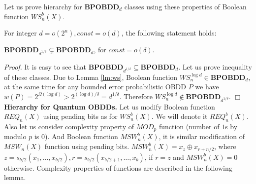 \documentclass{llncs}
\newcommand{\Beginproof}{{\em Proof.}  }
\newcommand{\Endproof}{\hfill$\Box$\\}
\begin{document}
Let us prove hierarchy for {\bf BPOBDD}$_d$ classes using these properties of Boolean function $WS_n^b(X)$.

\begin{theorem}\label{th:prob-hi}
For integer $d=o(2^n), const = o(d)$, the following statement holds: 

{\bf BPOBDD}$_{d^{1/\delta}}\subsetneq${\bf BPOBDD}$_d$, for  $const=o(\delta)$. 
\end{theorem}
\Beginproof
%
It is easy to see that {\bf BPOBDD}$_{d^{1/\delta}}\subseteq${\bf BPOBDD}$_d$. Let us prove inequality of these classes.
%
Due to Lemma \ref{lm:ws}, Boolean function $WS_n^{\log d}\in${\bf BPOBDD}$_d$, at the same time for any bounded error probabilistic OBDD $P$ we have $w(P)=2^{\Omega(\log d)}>2^{(\log d)/\delta}=d^{1/\delta}$. Therefore $WS_n^{\log d}\not\in${\bf BPOBDD}$_{d^{1/\delta}}$.
\Endproof

{\bf Hierarchy for Quantum OBDDs. }
Let us  modify Boolean function $REQ_n(X)$ using pending bits as for $WS_n^b(X)$. We will denote it $REQ^b_n(X)$. Also let us consider complexity property of $MOD_p$ function (number of $1$s by modulo $p$ is $0$). And Boolean function $MSW_n^b(X)$, it is similar modification of $MSW_n(X)$ function \cite{s06}  using pending bits. $MSW_n^b(X)=x_z\oplus x_{r+n/2}$, where $z=s_{b/2}(x_1,\dots,x_{b/2}), r=s_{b/2}(x_{b/2+1},\dots,x_{b})$, if $r=z$ and $MSW_n^b(X)=0$ otherwise. Complexity properties of functions are described in the following lemma.






\end{document}
